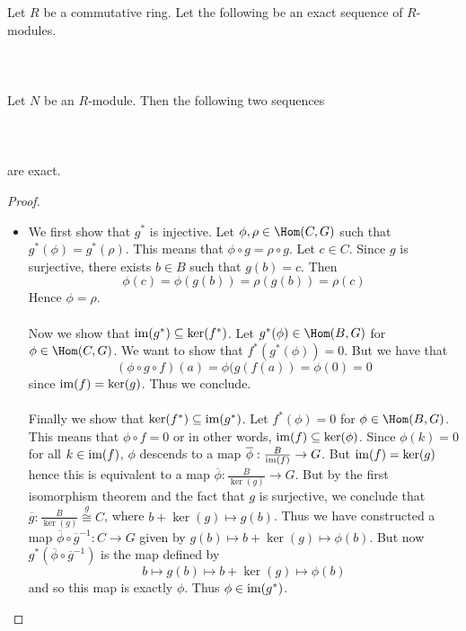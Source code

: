 \documentclass[a4paper]{article}
\begin{document}
\begin{prp}{}{} Let $R$ be a commutative ring. Let the following be an exact sequence of $R$-modules. \\~\\
\\~\\ Let $N$ be an $R$-module. Then the following two sequences \\~\\
 \\~\\ 
are exact. 
\begin{proof}~\\
\begin{itemize}
\item We first show that $g^\ast$ is injective. Let $\phi,\rho\in\Hom(C,G)$ such that $g^\ast(\phi)=g^\ast(\rho)$. This means that $\phi\circ g=\rho\circ g$. Let $c\in C$. Since $g$ is surjective, there exists $b\in B$ such that $g(b)=c$. Then $$\phi(c)=\phi(g(b))=\rho(g(b))=\rho(c)$$ Hence $\phi=\rho$. \\~\\

Now we show that $\operatorname{im}(g^\ast)\subseteq\ker(f^\ast)$. Let $g^\ast(\phi)\in\Hom(B,G)$ for $\phi\in\Hom(C,G)$. We want to show that $f^\ast(g^\ast(\phi))=0$. But we have that $$(\phi\circ g\circ f)(a)=\phi(g(f(a))=\phi(0)=0$$ since $\operatorname{im}(f)=\ker(g)$. Thus we conclude. \\~\\

Finally we show that $\ker(f^\ast)\subseteq\operatorname{im}(g^\ast)$. Let $f^\ast(\phi)=0$ for $\phi\in\Hom(B,G)$. This means that $\phi\circ f=0$ or in other words, $\operatorname{im}(f)\subseteq\ker(\phi)$.
Since $\phi(k)=0$ for all $k\in\operatorname{im}(f)$, $\phi$ descends to a map $\overline{\phi}:\frac{B}{\operatorname{im}(f)}\to G$. But $\operatorname{im}(f)=\ker(g)$ hence this is equivalent to a map $\overline{\phi}:\frac{B}{\ker(g)}\to G$. But by the first isomorphism theorem and the fact that $g$ is surjective, we conclude that $\overline{g}:\frac{B}{\ker(g)}\overset{g}{\cong} C$, where $b+\ker(g)\mapsto g(b)$. Thus we have constructed a map $\overline{\phi}\circ\overline{g}^{-1}:C\to G$ given by $g(b)\mapsto b+\ker(g)\mapsto\phi(b)$. But now $g^\ast(\overline{\phi}\circ\overline{g}^{-1})$ is the map defined by $$b\mapsto g(b)\mapsto b+\ker(g)\mapsto\phi(b)$$ and so this map is exactly $\phi$. Thus $\phi\in\operatorname{im}(g^\ast)$. 
\end{itemize}
\end{proof}
\end{prp}
\end{document}
